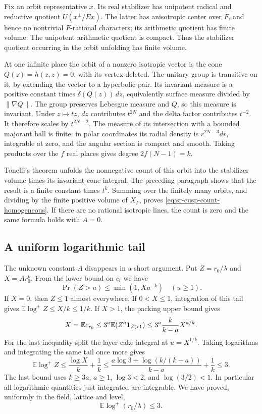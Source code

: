 Fix an orbit representative \(x\).
Its real stabilizer has unipotent radical and reductive
quotient \(U(x^\perp/Ex)\).
The latter has anisotropic center over \(F\), and hence no
nontrivial \(F\)-rational characters; its arithmetic
quotient has finite volume.
The unipotent arithmetic quotient is compact.
Thus the stabilizer quotient occurring in the orbit
unfolding has finite volume.

At one infinite place the orbit of a nonzero isotropic
vector is the cone \(Q(z)=h(z,z)=0\), with its vertex deleted.
The unitary group is transitive on it, by extending the
vector to a hyperbolic pair.
Its invariant measure is a positive constant times
\(\delta(Q(z))\,dz\), equivalently surface measure divided
by \(\|\nabla Q\|\).
The group preserves Lebesgue measure and \(Q\), so this
measure is invariant.
Under \(z\mapsto tz\), \(dz\) contributes \(t^{2N}\)
and the delta factor contributes \(t^{-2}\).
It therefore scales by \(t^{2N-2}\).
The measure of its intersection with a bounded majorant
ball is finite: in polar coordinates its radial density
is \(r^{2N-3}dr\), integrable at zero, and the angular
section is compact and smooth.
Taking products over the \(f\) real places gives degree
\(2f(N-1)=k\).

Tonelli's theorem unfolds the nonnegative count of this
orbit into the stabilizer volume times its invariant
cone integral.
The preceding paragraph shows that the result is a finite
constant times \(t^k\).
Summing over the finitely many orbits, and dividing by
the finite positive volume of \(X_\Gamma\), proves
\eqref{eq:sr-cusp-count-homogeneous}.
If there are no rational isotropic lines, the count is
zero and the same formula holds with \(A=0\).

\subsection{A uniform logarithmic tail}

The unknown constant \(A\) disappears in a short argument.
Put \(Z=r_0/\lambda\) and \(X=A r_0^k\).
From the lower bound on \(c_t\) we have
\[
             \Pr(Z>u)\le\min(1,Xu^{-k})\quad(u\ge1).
\]
If \(X=0\), then \(Z\le1\) almost everywhere.
If \(0<X\le1\), integration of this tail gives
\(\mathbb E\log^+ Z\le X/k\le1/k\).
If \(X>1\), the packing upper bound gives
\[
 X=\mathbb E c_{r_0}
       \le3^a\mathbb E(Z^a{\bf1}_{Z>1})
       \le3^a\frac{k}{k-a}X^{a/k}.
\]
For the last inequality split the layer-cake integral
at \(u=X^{1/k}\).
Taking logarithms and integrating the same tail once
more gives
\[
 \mathbb E\log^+ Z
 \le\frac{\log X}{k}+\frac1k
 \le \frac{a\log3+\log(k/(k-a))}{k-a}+\frac1k
 \le3 .
\]
The last bound uses \(k\ge3a\), \(a\ge1\),
\(\log3<2\), and \(\log(3/2)<1\).
In particular all logarithmic quantities just integrated
are integrable.  We have proved, uniformly in the field,
lattice and level,
\begin{equation}\label{eq:sr-cusp-minimum-mean}
             \mathbb E\log^+(r_0/\lambda)\le3 .
\end{equation}

